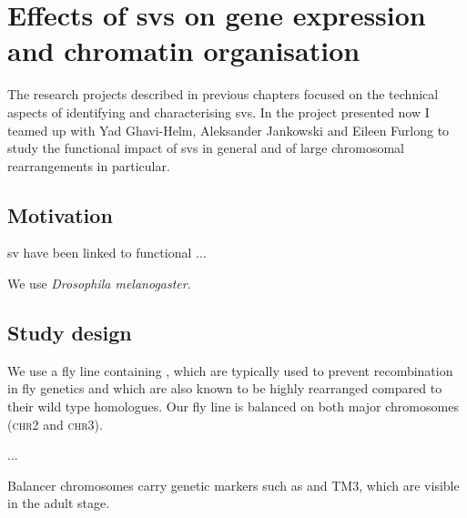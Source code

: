 \chapter{Effects of \acsp{sv} on gene expression and chromatin organisation}

The research projects described in previous chapters focused on the technical 
aspects of identifying and characterising \acp{sv}. In the project presented 
now I teamed up with Yad Ghavi-Helm, Aleksander Jankowski and Eileen Furlong
to study the functional impact of \acp{sv} in general and of large chromosomal
rearrangements in particular.

\section{Motivation}

\Ac{sv} have been linked to functional ...

We use \textit{Drosophila melanogaster}.

\section{Study design}

We use a fly line containing , which are typically used to prevent recombination in fly genetics and
which are also known to be highly rearranged compared to their wild type
homologues. Our fly line is balanced on both major chromosomes (\textsc{chr2}
and \textsc{chr3}).

...

Balancer chromosomes carry genetic markers such as  and TM3, which are visible in the adult stage.